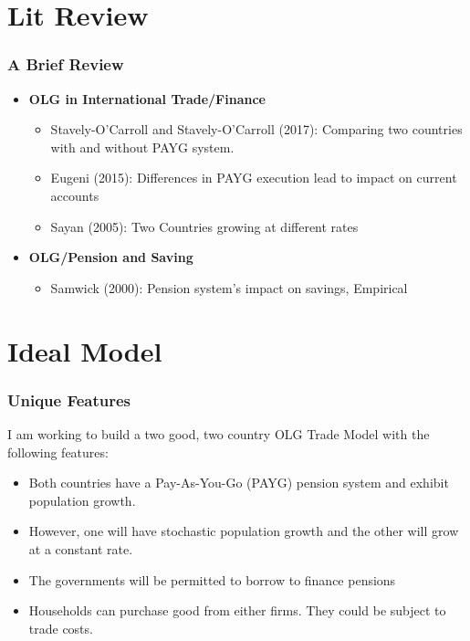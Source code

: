 \documentclass[11pt]{beamer}
\theoremstyle{definition}
\begin{document}
\section{Lit Review} 
\begin{frame}
    \frametitle{A Brief Review}

    \begin{itemize}
        \item \textbf{OLG in International Trade/Finance}
            \begin{itemize}
                \item Stavely-O'Carroll and Stavely-O'Carroll (2017): Comparing two countries with and without PAYG system.

                \item Eugeni (2015): Differences in PAYG execution lead to impact on current accounts
                \item Sayan (2005): Two Countries growing at different rates


            \end{itemize}

        \item \textbf{OLG/Pension and Saving}
            \begin{itemize}
                \item Samwick (2000): Pension system's impact on savings, Empirical

            \end{itemize}

    \end{itemize}

\end{frame}

\section{Ideal Model} 
\begin{frame}
    \frametitle{Unique Features}
I am working to build a two good, two country OLG Trade Model with the following features:
    \begin{itemize}
        \item Both countries have a Pay-As-You-Go (PAYG) pension system and exhibit population growth.
        \item However, one will have stochastic population growth and the other will grow at a constant rate.
        \item The governments will be permitted to borrow to finance pensions
        \item Households can purchase good from either firms. They could be subject to trade costs.

    \end{itemize}


\end{frame}
\end{document}

